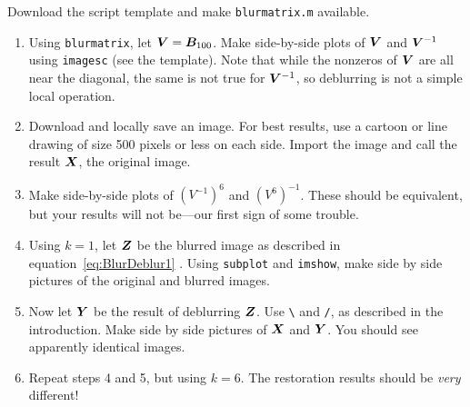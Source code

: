 \documentclass[11pt,twoside]{article}
\begin{document}
Download the script template and make \texttt{blurmatrix.m} available. 
\begin{enumerate}

\item Using \texttt{blurmatrix}, let $\bm{V}=\bm{B}_{100}$. Make side-by-side plots of $\bm{V}$ and $\bm{V}^{-1}$ using \texttt{imagesc} (see the template). Note that while the nonzeros of $\bm{V}$ are all near the diagonal, the same is not true for $\bm{V}^{-1}$, so deblurring is not a simple local operation.  \item Download and locally save an image. For best results, use a cartoon or line drawing of size 500 pixels or less on each side. Import the image and call the result $\bm{X}$, the original image.

\item Make side-by-side plots of $(V^{-1})^6$ and $(V^6)^{-1}$. These should be equivalent, but your results will not be---our first sign of some trouble.

\item Using $k=1$, let $\bm{Z}$ be the blurred image as described in equation~\eqref{eq:BlurDeblur1} . Using \texttt{subplot} and \texttt{imshow}, make side by side pictures of the original and blurred images.

\item Now let $\bm{Y}$ be the result of deblurring $\bm{Z}$. Use \verb+\+ and \verb+/+, as described in the introduction. Make side by side pictures of $\bm{X}$ and $\bm{Y}$. You should see apparently
  identical images.

\item Repeat steps 4 and 5, but using $k=6$. The restoration results should be \emph{very}
  different!

\end{enumerate}
\end{document}
